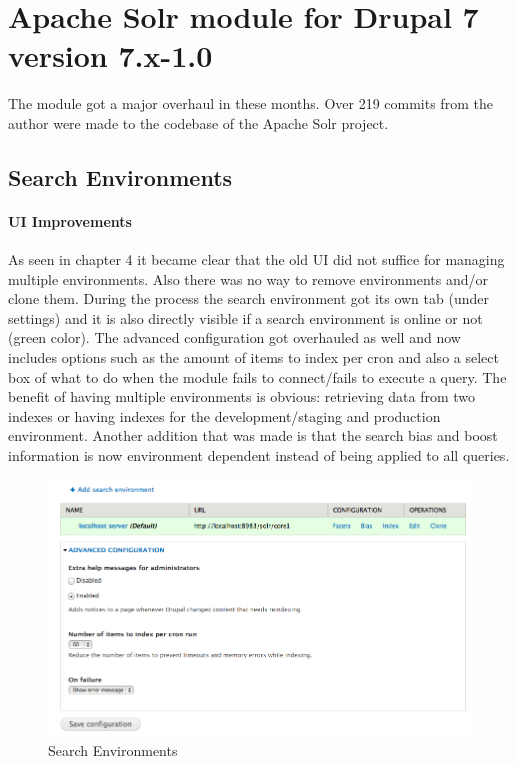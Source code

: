 \section{Apache Solr module for Drupal 7 version 7.x-1.0}
The module got a major overhaul in these months. Over 219 commits from the author were made to the codebase of the Apache Solr project.
\subsection{Search Environments}
\paragraph{UI Improvements}
As seen in chapter 4 it became clear that the old UI did not suffice for managing multiple environments. Also there was no way to remove environments and/or clone them. During the process the search environment got its own tab (under settings) and it is also directly visible if a search environment is online or not (green color). 
The advanced configuration got overhauled as well and now includes options such as the amount of items to index per cron and also a select box of what to do when the module fails to connect/fails to execute a query. The benefit of having multiple environments is obvious: retrieving data from two indexes or having indexes for the development/staging and production environment. 
Another addition that was made is that the search bias and boost information is now environment dependent instead of being applied to all queries.

\begin{figure}[H]
     \includegraphics[width=\textwidth]{images/implementation/search_environments.png}
     \caption{Search Environments}
\end{figure}

